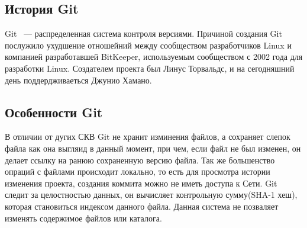 \documentclass[14pt,a4paper]{article}
\begin{document}
\subsection{История Git}
Git ~--- распределенная система контроля версиями. Причиной создания Git
послужило ухудшение отношейний между сообществом разработчиков Linux и компанией
разработавшей BitKeeper, используемым сообществом с 2002 года для разработки
Linux. Создателем проекта был Линус Торвальдс, и на сегодняшний день
поддердживаеться Джунио Хамано.
\subsection{Особенности Git}
В отличии от дугих СКВ Git не хранит изминения файлов, а сохраняет слепок файла
как она выгляид в данный момент, при чем, если файл не был изменен, он делает
ссылку на ранюю сохраненную версию файла. Так же большенство опраций с файлами
происходит локально, то есть для просмотра истории изменения проекта, создания
коммита можно не иметь доступа к Сети.
Git следит за целостностью данных, он вычисляет контрольную сумму(SHA-1 хеш),
которая становиться индексом данного файла. Данная система не позваляет изменять
содержимое файлов или каталога.
\end{document}
